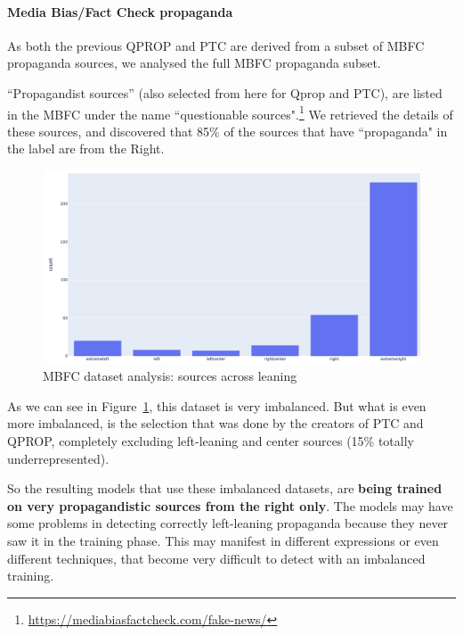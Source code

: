 \paragraph{Media Bias/Fact Check propaganda}
As both the previous QPROP and PTC are derived from a subset of MBFC propaganda sources, we analysed the full MBFC propaganda subset.

“Propagandist sources” (also selected from here for Qprop and PTC), are listed in the MBFC under the name ``questionable sources".\footnote{\url{https://mediabiasfactcheck.com/fake-news/}}
We retrieved the details of these sources, and discovered that 85\% of the sources that have ``propaganda" in the label are from the Right.

\begin{figure}[!htb]
   \centering
   \includegraphics[width=\linewidth]{figures/leaning_questionable.png}
   \caption{MBFC dataset analysis: sources across leaning}
   \label{fig:mbfc_across_leaning}
\end{figure}

As we can see in Figure~\ref{fig:mbfc_across_leaning}, this dataset is very imbalanced. But what is even more imbalanced, is the selection that was done by the creators of PTC and QPROP, completely excluding left-leaning and center sources (15\% totally underrepresented).

So the resulting models that use these imbalanced datasets, are \textbf{being trained on very propagandistic sources from the right only}. The models may have some problems in detecting correctly left-leaning propaganda because they never saw it in the training phase. This may manifest in different expressions or even different techniques, that become very difficult to detect with an imbalanced training. 

